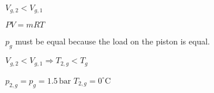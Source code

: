 \( V_{g,2} < V_{g,1} \)  

\( PV = mRT \)  

\( p_{g} \) must be equal because the load on the piston is equal.  

\( V_{g,2} < V_{g,1} \Rightarrow T_{2,g} < T_{g} \)  

\( p_{2,g} = p_{g} = 1.5 \, \text{bar} \)  
\( T_{2,g} = 0^\circ \text{C} \)